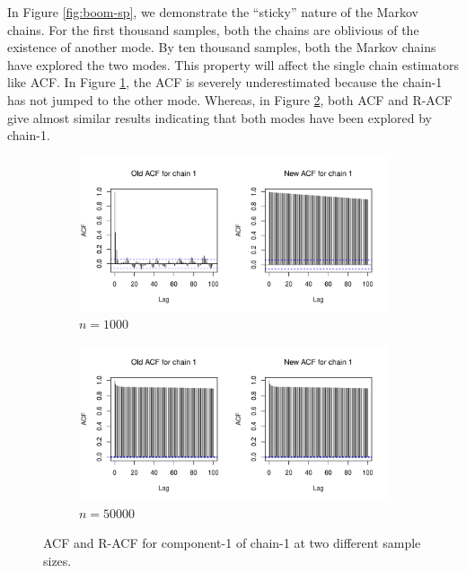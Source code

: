 \documentclass[12pt]{article}
\theoremstyle{remark}
\begin{document}
In Figure \ref{fig:boom-sp}, we demonstrate the ``sticky'' nature of the Markov chains. For the first thousand samples, both the chains are oblivious of the existence of another mode. By ten thousand samples, both the Markov chains have explored the two modes. This property will affect the single chain estimators like ACF. In Figure \ref{subfig:boom-acf_1e3}, the ACF is severely underestimated because the chain-1 has not jumped to the other mode. Whereas, in Figure \ref{subfig:boom-acf_1e4}, both ACF and R-ACF give almost similar results indicating that both modes have been explored by chain-1. 

\begin{figure}[h]
    \centering
    \begin{subfigure}[h]{.7\textwidth}
      \centering
      \includegraphics[width = \textwidth]{plots/boom-acf,n=1000.pdf}
      \caption{$n = 1000$}
      \label{subfig:boom-acf_1e3}
    \end{subfigure}
    \begin{subfigure}[h]{.7\textwidth}
      \centering
      \includegraphics[width = \textwidth]{plots/boom-acf,n=50000.pdf}
      \caption{$n = 50000$}
      \label{subfig:boom-acf_1e4}
    \end{subfigure}
    \caption{ACF and R-ACF for component-1 of chain-1 at two different sample sizes. }
    \label{fig:boom-acf}
\end{figure}
\end{document}
